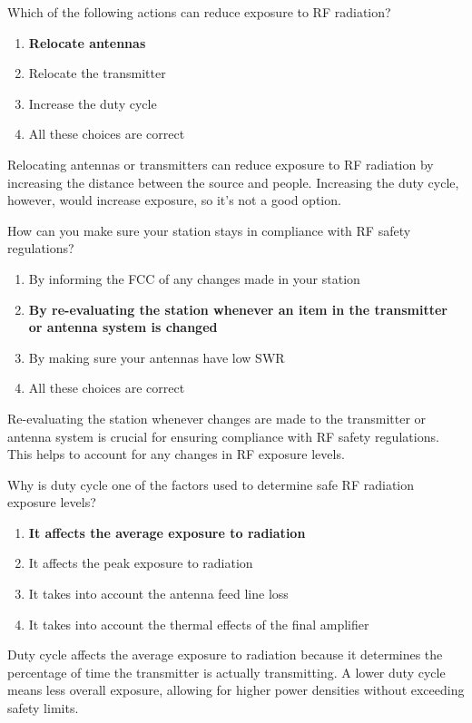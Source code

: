 \begin{tcolorbox}[colback=gray!10!white,colframe=black!75!black,title={T0C08}]
Which of the following actions can reduce exposure to RF radiation?
\begin{enumerate}[label=\Alph*),noitemsep]
    \item \textbf{Relocate antennas}
    \item Relocate the transmitter
    \item Increase the duty cycle
    \item All these choices are correct
\end{enumerate}
\end{tcolorbox}
Relocating antennas or transmitters can reduce exposure to RF radiation by increasing the distance between the source and people. Increasing the duty cycle, however, would increase exposure, so it's not a good option.

\begin{tcolorbox}[colback=gray!10!white,colframe=black!75!black,title={T0C09}]
How can you make sure your station stays in compliance with RF safety regulations?
\begin{enumerate}[label=\Alph*),noitemsep]
    \item By informing the FCC of any changes made in your station
    \item \textbf{By re-evaluating the station whenever an item in the transmitter or antenna system is changed}
    \item By making sure your antennas have low SWR
    \item All these choices are correct
\end{enumerate}
\end{tcolorbox}
Re-evaluating the station whenever changes are made to the transmitter or antenna system is crucial for ensuring compliance with RF safety regulations. This helps to account for any changes in RF exposure levels.

\begin{tcolorbox}[colback=gray!10!white,colframe=black!75!black,title={T0C10}]
Why is duty cycle one of the factors used to determine safe RF radiation exposure levels?
\begin{enumerate}[label=\Alph*),noitemsep]
    \item \textbf{It affects the average exposure to radiation}
    \item It affects the peak exposure to radiation
    \item It takes into account the antenna feed line loss
    \item It takes into account the thermal effects of the final amplifier
\end{enumerate}
\end{tcolorbox}
Duty cycle affects the average exposure to radiation because it determines the percentage of time the transmitter is actually transmitting. A lower duty cycle means less overall exposure, allowing for higher power densities without exceeding safety limits.

